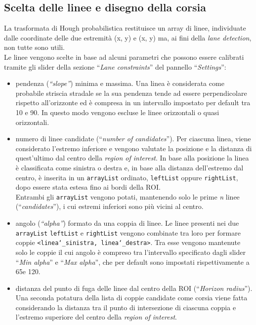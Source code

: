 \documentclass[12pt]{article}
\begin{document}
\subsection{Scelta delle linee e disegno della corsia}
\hspace{0.2 cm} La trasformata di Hough probabilistica restituisce un array di linee, individuate dalle coordinate delle due estremità (x, y) e (x, y) ma, ai fini della \textit{lane detection}, non tutte sono utili. \\
Le linee vengono scelte in base ad alcuni parametri che possono essere calibrati tramite gli slider della sezione ``\textit{Lane constraints}'' del pannello ``\textit{Settings}'':
\begin{itemize}
\item pendenza (\textit{``slope''}) minima e massima. Una linea è considerata come probabile striscia stradale se la sua pendenza tende ad essere perpendicolare rispetto all'orizzonte ed è compresa in un intervallo impostato per default tra 10 e 90\degree. In questo modo vengono escluse le linee orizzontali o quasi orizzontali.
\item numero di linee candidate (``\textit{number of candidates}''). Per ciascuna linea, viene considerato l'estremo inferiore e vengono valutate la posizione e la distanza di quest'ultimo dal centro della \textit{region of interest}. In base alla posizione la linea è classificata come sinistra o destra e, in base alla distanza dell'estremo dal centro, è inserita in un \texttt{arrayList} ordinato, \texttt{leftList} oppure \texttt{rightList}, dopo essere stata estesa fino ai bordi della ROI. \\
Entrambi gli \texttt{arrayList} vengono potati, mantenendo solo le prime \textit{n} linee (``\textit{candidates}''), i cui estremi inferiori sono più vicini al centro.
\item angolo (\textit{``alpha''}) formato da una coppia di linee. Le linee presenti nei due \texttt{arrayList} \texttt{leftList} e \texttt{rightList} vengono combinate tra loro per formare coppie \texttt{<linea\char`_sinistra, linea\char`_destra>}. Tra esse vengono mantenute solo le coppie il cui angolo è compreso tra l'intervallo specificato dagli slider ``\textit{Min alpha}'' e ``\textit{Max alpha}'', che per default sono impostati rispettivamente a 65\degree e 120\degree.
\item distanza del punto di fuga delle linee dal centro della ROI (``\textit{Horizon radius}''). Una seconda potatura della lista di coppie candidate come corsia viene fatta considerando la distanza tra il punto di intersezione di ciascuna coppia e l'estremo superiore del centro della \textit{region of interest}.\\

\end{itemize}
\end{document}
